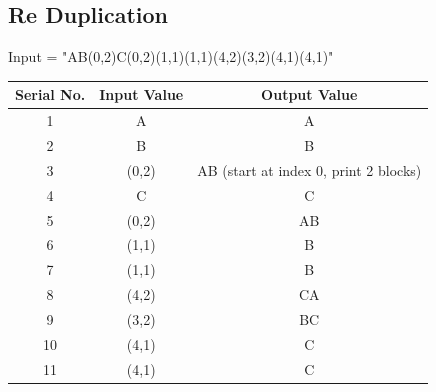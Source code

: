 \documentclass{article}
\begin{document}
   \subsection{Re Duplication}
   Input = "AB(0,2)C(0,2)(1,1)(1,1)(4,2)(3,2)(4,1)(4,1)"
   \begin{table}[!th]
   \begin{tabular}{|c|c|c|}
   \hline
   \textbf{Serial No.} & \textbf{Input Value} & \textbf{Output Value} \\
   \hline
   1 & A & A\\
   2 & B & B\\
   3 & (0,2) & AB (start at index 0, print 2 blocks)\\
   4 & C & C\\
   5 & (0,2) & AB\\
   6 & (1,1) & B\\
   7 & (1,1) & B\\
   8 & (4,2) & CA\\
   9 & (3,2) & BC\\
   10 & (4,1) & C\\
   11 & (4,1) & C\\
   \hline
   \end{tabular}
   \end{table}
\end{document}

